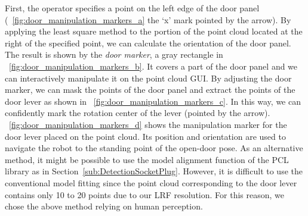 First, the operator specifies a point on the left edge of the door panel
(\figurename~\ref{fig:door_manipulation_markers_a} the `x' mark pointed by the arrow).
By applying the least square method to the portion of the point cloud located at the right of
the specified point, we can calculate the orientation of the door panel.
The result is shown by the {\it door marker}, a gray rectangle in
\figurename~\ref{fig:door_manipulation_markers_b}.
It covers a part of the door panel and we can interactively manipulate it on the point cloud GUI.
By adjusting the door marker, we can mask the points of the door panel and extract the points of
the door lever as shown in \figurename~\ref{fig:door_manipulation_markers_c}.
In this way, we can confidently mark the rotation center of the lever (pointed by the arrow).
\figurename~\ref{fig:door_manipulation_markers_d} shows the manipulation marker for the door lever
placed on the point cloud.
Its position and orientation are used to navigate the robot to the standing point of the open-door pose.
As an alternative method, it might be possible to use the model alignment function of the PCL library
as in Section~\ref{sub:DetectionSocketPlug}.
However, it is difficult to use the conventional model fitting since the point cloud corresponding to
the door lever contains only 10 to 20 points due to our LRF resolution. 
For this reason, we chose the above method relying on human perception.

